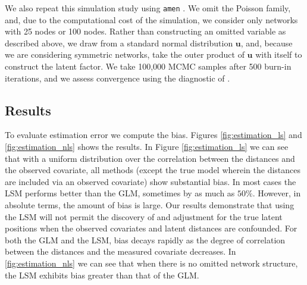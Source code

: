 \documentclass[11pt]{article}
\begin{document}
We also repeat this simulation study using \texttt{amen}
\citep{hoff2015dyadic, minhas2016inferential}. We omit the Poisson
family, and, due to the computational cost of the simulation, we
consider only networks with 25 nodes or 100 nodes. Rather than
constructing an omitted variable as described above, we draw from a
standard normal distribution $\mathbf{u}$, and, because we are
considering symmetric networks, take the outer product of $\mathbf{u}$
with itself to construct the latent factor. We take 100,000 MCMC
samples after 500 burn-in iterations, and we assess convergence using
the diagnostic of \cite{raftery1992practical}.

\subsection{Results}

To evaluate estimation error we compute the bias. Figures
\ref{fig:estimation_ls} and \ref{fig:estimation_nls} shows the
results. In Figure \ref{fig:estimation_ls} we can see that with a
uniform distribution over the correlation between the distances and
the observed covariate, all methods (except the true model wherein the
distances are included via an observed covariate) show substantial
bias. In most cases the LSM performs better than the GLM, sometimes by
as much as $50\%$. However, in absolute terms, the amount of bias is
large. Our results demonstrate that using the LSM will not permit the
discovery of and adjustment for the true latent positions when the
observed covariates and latent distances are confounded.  For both the
GLM and the LSM, bias decays rapidly as the degree of correlation
between the distances and the measured covariate decreases. In
\ref{fig:estimation_nls} we can see that when there is no omitted
network structure, the LSM exhibits bias greater than that of the GLM.
\end{document}

